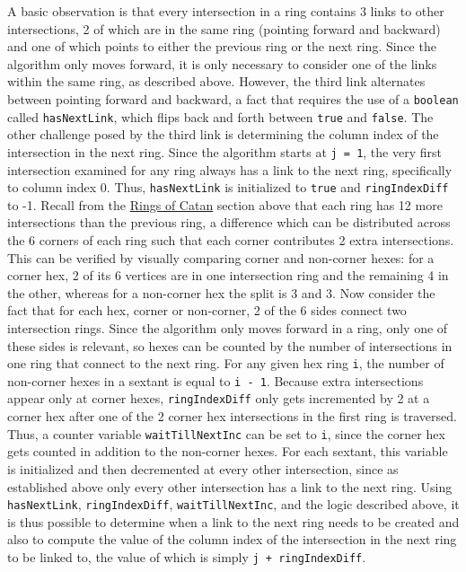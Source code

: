 \documentclass[pageno]{jpaper}
\begin{document}
\begin{doublespacing}
A basic observation is that every intersection in a ring contains 3 links to other intersections, 2 of which are in the same ring (pointing forward and backward) and one of which points to either the previous ring or the next ring. Since the algorithm only moves forward, it is only necessary to consider one of the links within the same ring, as described above. However, the third link alternates between pointing forward and backward, a fact that requires the use of a \lstinline$boolean$ called \lstinline$hasNextLink$, which flips back and forth between \lstinline$true$ and \lstinline$false$. The other challenge posed by the third link is determining the column index of the intersection in the next ring. Since the algorithm starts at \lstinline$j = 1$, the very first intersection examined for any ring always has a link to the next ring, specifically to column index 0. Thus, \lstinline$hasNextLink$ is initialized to \lstinline$true$ and \lstinline$ringIndexDiff$ to -1. Recall from the \hyperlink{sec:rings_of_catan}{Rings of Catan} section above that each ring has 12 more intersections than the previous ring, a difference which can be distributed across the 6 corners of each ring such that each corner contributes 2 extra intersections. This can be verified by visually comparing corner and non-corner hexes: for a corner hex, 2 of its 6 vertices are in one intersection ring and the remaining 4 in the other, whereas for a non-corner hex the split is 3 and 3. Now consider the fact that for each hex, corner or non-corner, 2 of the 6 sides connect two intersection rings. Since the algorithm only moves forward in a ring, only one of these sides is relevant, so hexes can be counted by the number of intersections in one ring that connect to the next ring. For any given hex ring \lstinline$i$, the number of non-corner hexes in a sextant is equal to \lstinline$i - 1$. Because extra intersections appear only at corner hexes, \lstinline$ringIndexDiff$ only gets incremented by 2 at a corner hex after one of the 2 corner hex intersections in the first ring is traversed. Thus, a counter variable \lstinline$waitTillNextInc$ can be set to \lstinline$i$, since the corner hex gets counted in addition to the non-corner hexes. For each sextant, this variable is initialized and then decremented at every other intersection, since as established above only every other intersection has a link to the next ring. Using \lstinline$hasNextLink$, \lstinline$ringIndexDiff$, \lstinline$waitTillNextInc$, and the logic described above, it is thus possible to determine when a link to the next ring needs to be created and also to compute the value of the column index of the intersection in the next ring to be linked to, the value of which is simply \lstinline$j + ringIndexDiff$.


\end{doublespacing}
\end{document}
